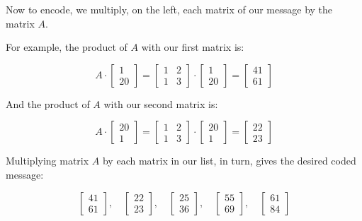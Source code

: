 \begin{solution}
    Now to encode, we multiply, on the left, each matrix of our message by the matrix \( A \).

    For example, the product of \( A \) with our first matrix is:

    \[
        A \cdot \begin{bmatrix} 1 \\ 20 \end{bmatrix} = \begin{bmatrix} 1 & 2 \\ 1 & 3 \end{bmatrix} \cdot \begin{bmatrix} 1 \\ 20 \end{bmatrix} = \begin{bmatrix} 41 \\ 61 \end{bmatrix}
    \]

    And the product of \( A \) with our second matrix is:

    \[
        A \cdot \begin{bmatrix} 20 \\ 1 \end{bmatrix} = \begin{bmatrix} 1 & 2 \\ 1 & 3 \end{bmatrix} \cdot \begin{bmatrix} 20 \\ 1 \end{bmatrix} = \begin{bmatrix} 22 \\ 23 \end{bmatrix}
    \]

    Multiplying matrix \( A \) by each matrix in our list, in turn, gives the desired coded message:

    \[
        \begin{bmatrix} 41 \\ 61 \end{bmatrix}, \quad
        \begin{bmatrix} 22 \\ 23 \end{bmatrix}, \quad
        \begin{bmatrix} 25 \\ 36 \end{bmatrix}, \quad
        \begin{bmatrix} 55 \\ 69 \end{bmatrix}, \quad
        \begin{bmatrix} 61 \\ 84 \end{bmatrix}
    \]

\end{solution}



